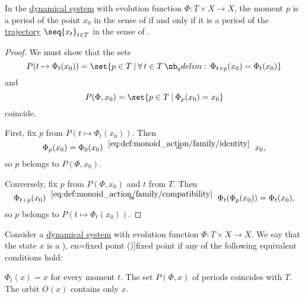 \begin{proposition}\label{thm:dynamical_system_trajectory_period}
  In the \hyperref[def:dynamical_system]{dynamical system} with evolution function \( \Phi: T \times X \to X \), the moment \( p \) is a period of the point \( x_0 \) in the sense of  if and only if it is a period of the \hyperref[def:dynamical_system_trajectory]{trajectory} \( \seq{ x_t }_{t \in T} \) in the sense of .
\end{proposition}
\begin{proof}
  We must show that the sets
  \begin{equation*}
    P(t \mapsto \Phi_t(x_0)) = \set{ p \in T \given \qforall* {t \in T} \Phi_{t + p}(x_0) = \Phi_t(x_0) }
  \end{equation*}
  and
  \begin{equation*}
    P(\Phi, x_0) = \set{ p \in T \given \Phi_p(x_0) = x_0 }
  \end{equation*}
  coincide.

  First, fix \( p \) from \( P(t \mapsto \Phi_t(x_0)) \). Then
  \begin{equation*}
    \Phi_p(x_0)
    =
    \Phi_0(x_0)
    \reloset {\ref{eq:def:monoid_action/family/identity}} =
    x_0,
  \end{equation*}
  so \( p \) belongs to \( P(\Phi, x_0) \).

  Conversely, fix \( p \) from \( P(\Phi, x_0) \) and \( t \) from \( T \). Then
  \begin{equation*}
    \Phi_{t + p}(x_0)
    \reloset {\ref{eq:def:monoid_action/family/compatibility}} =
    \Phi_t(\Phi_p(x_0))
    =
    \Phi_t(x_0),
  \end{equation*}
  so \( p \) belongs to \( P(t \mapsto \Phi_t(x_0)) \).
\end{proof}

\begin{definition}\label{def:dynamical_system_fixed_point}
  Consider a \hyperref[def:dynamical_system]{dynamical system} with evolution function \( \Phi: T \times X \to X \). We say that the state \( x \) is a \term[ru=неподвижная точка (\cite[39]{Юмагулов2015ДинамическиеСистемы}), en=fixed point (\cite[2]{BrinStuck2002DynamicalSystems})]{fixed point} if any of the following equivalent conditions hold:

  \begin{thmenum}
     \( \Phi_t(x) = x \) for every moment \( t \).
    \mimprovised The set \( P(\Phi, x) \) of periods coincides with \( T \).
     The orbit \( O(x) \) contains only \( x \).
  \end{thmenum}
\end{definition}

